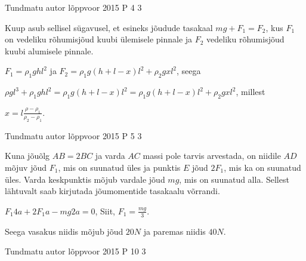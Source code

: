 \documentclass[11pt]{article}
\begin{document}
{%
{Tundmatu autor} %
{lõppvoor} %
{2015} %
{P 4} %
{3} %
{

\ifSolution
Kuup asub sellisel sügavusel, et esineks jõudude tasakaal $mg + F_1 = F_2$, kus $F_1$ on vedeliku rõhumisjõud kuubi ülemisele pinnale ja $F_2$ vedeliku rõhumisjõud kuubi alumisele pinnale.
\begin{center}
$F_1 = \rho_1 g h l^2$ ja $F_2 = \rho_1 g (h + l - x) l^2 + \rho_2 g x l^2$, seega
\end{center}
\begin{center}
$\rho g l^3 + \rho_1 gh l^2 = \rho_1 g(h + l - x)l^2 = \rho_1 g (h +l -x)l^2 + \rho_2 g x l^2$, millest 
\end{center}
\begin{center}
$x = l\frac{\rho - \rho_1}{\rho_2 - \rho_1}$.
\end{center}
 \fi
}

{Tundmatu autor} %
{lõppvoor} %
{2015} %
{P 5} %
{3} %
{

\ifSolution
Kuna jõuõlg $AB = 2BC$ ja varda $AC$ massi pole tarvis arvestada, on niidile $AD$ mõjuv jõud $F_1$, mis on suunatud üles ja punktis $E$ jõud $2F_1$, mis ka on suunatud üles. Varda keskpunktis mõjub vardale jõud $mg$, mis on suunatud alla. Sellest lähtuvalt saab kirjutada jõumomentide tasakaalu võrrandi. 
\begin{center}
$F_1 4a + 2F_1 a - mg2a = 0$, Siit, $F_1 = \frac{mg}{3}$. 
\end{center}
Seega vasakus niidis mõjub jõud $20 N$ ja paremas niidis $40 N$.
\fi
}

{Tundmatu autor} %
{lõppvoor} %
{2015} %
{P 10} %
{3} %
{

}}
\end{document}
